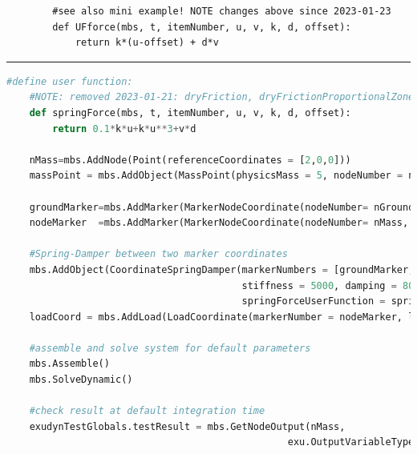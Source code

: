     \finishTable
    \userFunctionExample{}
    \pythonstyle\begin{lstlisting}
        #see also mini example! NOTE changes above since 2023-01-23
        def UFforce(mbs, t, itemNumber, u, v, k, d, offset):
            return k*(u-offset) + d*v
    \end{lstlisting}
\vspace{6pt}\par\noindent\rule{\textwidth}{0.4pt}
\label{miniExample_ObjectConnectorCoordinateSpringDamper}
\pythonstyle
\begin{lstlisting}[language=Python, firstnumber=1]
    #define user function:
    #NOTE: removed 2023-01-21: dryFriction, dryFrictionProportionalZone
    def springForce(mbs, t, itemNumber, u, v, k, d, offset): 
        return 0.1*k*u+k*u**3+v*d

    nMass=mbs.AddNode(Point(referenceCoordinates = [2,0,0]))
    massPoint = mbs.AddObject(MassPoint(physicsMass = 5, nodeNumber = nMass))
    
    groundMarker=mbs.AddMarker(MarkerNodeCoordinate(nodeNumber= nGround, coordinate = 0))
    nodeMarker  =mbs.AddMarker(MarkerNodeCoordinate(nodeNumber= nMass, coordinate = 0))
    
    #Spring-Damper between two marker coordinates
    mbs.AddObject(CoordinateSpringDamper(markerNumbers = [groundMarker, nodeMarker], 
                                         stiffness = 5000, damping = 80, 
                                         springForceUserFunction = springForce)) 
    loadCoord = mbs.AddLoad(LoadCoordinate(markerNumber = nodeMarker, load = 1)) #static linear solution:0.002

    #assemble and solve system for default parameters
    mbs.Assemble()
    mbs.SolveDynamic()

    #check result at default integration time
    exudynTestGlobals.testResult = mbs.GetNodeOutput(nMass, 
                                                 exu.OutputVariableType.Displacement)[0]
\end{lstlisting}

